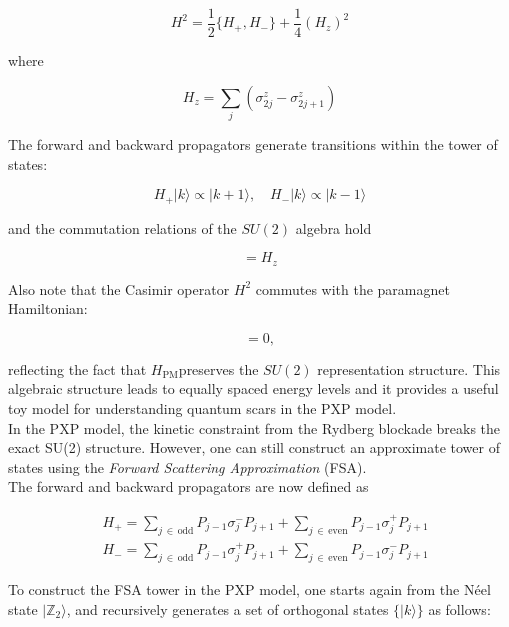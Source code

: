 \documentclass{article}
\begin{document}
\begin{equation}
H^2 = \frac{1}{2} \{ H_+, H_-\} + \frac{1}{4} \left( H_z\right)^2
\end{equation}

where

\begin{equation}
H_z = \sum_j \left( \sigma_{2j}^z - \sigma_{2j+1}^z\right)
\end{equation}

The forward and backward propagators generate transitions within the tower of states:

\begin{equation}
    H_+ |k\rangle \propto |k+1\rangle, \quad H_- |k\rangle \propto |k-1\rangle
\end{equation}

and the commutation relations of the $SU(2)$ algebra hold

\begin{equation}
[H_+,H_-] = H_z
\end{equation}

Also note that the Casimir operator $H^2$ commutes with the paramagnet Hamiltonian:

\begin{equation}
[H_{\mathrm{PM}},H^2] = 0,
\end{equation}

reflecting the fact that $H_{\mathrm{PM}}$​ preserves the $SU(2)$ representation structure.
This algebraic structure leads to equally spaced energy levels and it provides a useful toy model for understanding quantum scars in the PXP model.\\

In the PXP model, the kinetic constraint from the Rydberg blockade breaks the exact SU(2) structure. However, one can still construct an approximate tower of states using the \emph{Forward Scattering Approximation} (FSA).\\
The forward and backward propagators are now defined as 

\begin{align}
&H_+ = \sum_{j\,\in\,\mathrm{odd}} P_{j-1} \sigma_j^- P_{j+1} + \sum_{j\,\in\,\mathrm{even}} P_{j-1} \sigma_j^+ P_{j+1}\\
&H_- = \sum_{j\,\in\,\mathrm{odd}} P_{j-1} \sigma_j^+ P_{j+1} + \sum_{j\,\in\,\mathrm{even}} P_{j-1} \sigma_j^- P_{j+1}
\end{align}

To construct the FSA tower in the PXP model, one starts again from the Néel state \( |\mathbb{Z}_2\rangle \), and recursively generates a set of orthogonal states \( \{ |k\rangle \} \) as follows:
\end{document}
